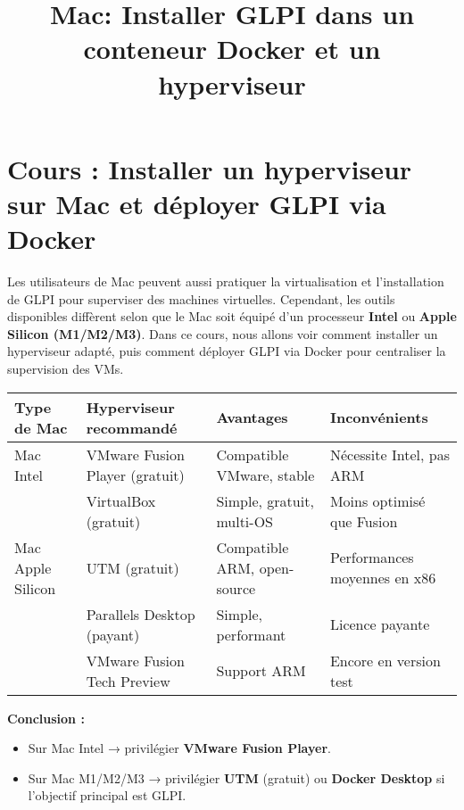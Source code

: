 \documentclass[11pt,a4paper]{article}
\title{Mac: Installer GLPI dans un conteneur Docker et un hyperviseur}
\author{}
\date{}
\begin{document}
\maketitle


\section{Cours : Installer un hyperviseur sur Mac et déployer GLPI via Docker}


\begin{tcolorbox}[title={Introduction}]
Les utilisateurs de Mac peuvent aussi pratiquer la virtualisation et l’installation de GLPI pour superviser des machines virtuelles.  
Cependant, les outils disponibles diffèrent selon que le Mac soit équipé d’un processeur \textbf{Intel} ou \textbf{Apple Silicon (M1/M2/M3)}.  
Dans ce cours, nous allons voir comment installer un hyperviseur adapté, puis comment déployer GLPI via Docker pour centraliser la supervision des VMs.
\end{tcolorbox}

\begin{tcolorbox}[title={1. Choix de l’hyperviseur selon le type de Mac}]
\begin{tabular}{|l|l|l|l|}
\hline
\textbf{Type de Mac} & \textbf{Hyperviseur recommandé} & \textbf{Avantages} & \textbf{Inconvénients} \\
\hline
Mac Intel & VMware Fusion Player (gratuit) & Compatible VMware, stable & Nécessite Intel, pas ARM \\
          & VirtualBox (gratuit)           & Simple, gratuit, multi-OS & Moins optimisé que Fusion \\
\hline
Mac Apple Silicon & UTM (gratuit)            & Compatible ARM, open-source & Performances moyennes en x86 \\
                  & Parallels Desktop (payant) & Simple, performant & Licence payante \\
                  & VMware Fusion Tech Preview & Support ARM & Encore en version test \\
\hline
\end{tabular}

\medskip
\textbf{Conclusion :}  
\begin{itemize}
  \item Sur Mac Intel → privilégier \textbf{VMware Fusion Player}.  
  \item Sur Mac M1/M2/M3 → privilégier \textbf{UTM} (gratuit) ou \textbf{Docker Desktop} si l’objectif principal est GLPI.  
\end{itemize}
\end{tcolorbox}
\end{document}
